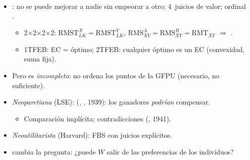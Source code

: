 \documentclass{article}
\begin{document}
\begin{columnas}
\begin{itemize}
\item {}: no se puede mejorar a nadie sin empeorar a otro; 4~juicios de valor; ordinal .
  \begin{itemize}
  \item 2×2×2×2: $\mathrm{RMST}^X_{LK}=\mathrm{RMST}^Y_{LK}$, $\mathrm{RMS}^A_{XY}=\mathrm{RMS}^B_{XY}=\mathrm{RMT}_{XY}$ $\Rightarrow$ .
  \item 1TFEB: EC = óptimo; 2TFEB: cualquier óptimo es un EC (convexidad, suma fija).
  \end{itemize}
\item Pero es \emph{incompleto}: no ordena los puntos de la GFPU (necesario, no suficiente).
\end{itemize}
\begin{itemize}
\item \emph{Neoparetiana} (LSE):  (, , 1939): los ganadores \emph{podrían} compensar.
  \begin{itemize}
  \item Comparación implícita; contradicciones (, 1941).
  \end{itemize}
\item \emph{Neoutilitarista} (Harvard): FBS con juicios explícitos.
\item {} cambia la pregunta: ¿puede $W$ salir de las preferencias de los individuos?
\end{itemize}


\end{columnas}
\end{document}
